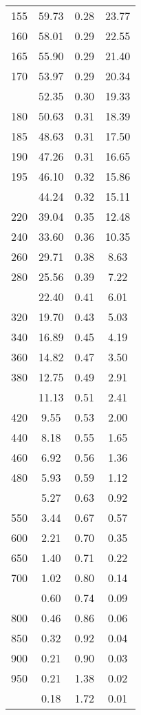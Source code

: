 \begin{table}[ht]
\begin{tabular}{lccc}
  155 & 59.73 & 0.28 & 23.77 \\ 
  160 & 58.01 & 0.29 & 22.55 \\ 
  165 & 55.90 & 0.29 & 21.40 \\ 
  170 & 53.97 & 0.29 & 20.34 \\ 
   \addlinespace
175 & 52.35 & 0.30 & 19.33 \\ 
  180 & 50.63 & 0.31 & 18.39 \\ 
  185 & 48.63 & 0.31 & 17.50 \\ 
  190 & 47.26 & 0.31 & 16.65 \\ 
  195 & 46.10 & 0.32 & 15.86 \\ 
   \addlinespace
200 & 44.24 & 0.32 & 15.11 \\ 
  220 & 39.04 & 0.35 & 12.48 \\ 
  240 & 33.60 & 0.36 & 10.35 \\ 
  260 & 29.71 & 0.38 & 8.63 \\ 
  280 & 25.56 & 0.39 & 7.22 \\ 
   \addlinespace
300 & 22.40 & 0.41 & 6.01 \\ 
  320 & 19.70 & 0.43 & 5.03 \\ 
  340 & 16.89 & 0.45 & 4.19 \\ 
  360 & 14.82 & 0.47 & 3.50 \\ 
  380 & 12.75 & 0.49 & 2.91 \\ 
   \addlinespace
400 & 11.13 & 0.51 & 2.41 \\ 
  420 & 9.55 & 0.53 & 2.00 \\ 
  440 & 8.18 & 0.55 & 1.65 \\ 
  460 & 6.92 & 0.56 & 1.36 \\ 
  480 & 5.93 & 0.59 & 1.12 \\ 
   \addlinespace
500 & 5.27 & 0.63 & 0.92 \\ 
  550 & 3.44 & 0.67 & 0.57 \\ 
  600 & 2.21 & 0.70 & 0.35 \\ 
  650 & 1.40 & 0.71 & 0.22 \\ 
  700 & 1.02 & 0.80 & 0.14 \\ 
   \addlinespace
750 & 0.60 & 0.74 & 0.09 \\ 
  800 & 0.46 & 0.86 & 0.06 \\ 
  850 & 0.32 & 0.92 & 0.04 \\ 
  900 & 0.21 & 0.90 & 0.03 \\ 
  950 & 0.21 & 1.38 & 0.02 \\ 
   \addlinespace
1000 & 0.18 & 1.72 & 0.01 \\ 
   \bottomrule
\end{tabular}
\end{table}
